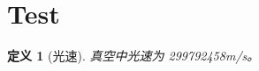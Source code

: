 \documentclass{article}
\newtheorem{dfn}{定义}[section]
\begin{document}
\section{Test}
\begin{dfn}[光速]
  真空中光速为 {299792458}{m/s}。
\end{dfn}
\end{document}
